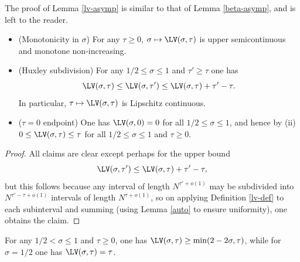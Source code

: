 The proof of Lemma \ref{lv-asymp} is similar to that of Lemma \ref{beta-asymp}, and is left to the reader.


\begin{lemma}\label{lv-basic}
    \begin{itemize}
        \item[(i)] (Monotonicity in $\sigma$) For any $\tau \geq 0$, $\sigma \mapsto \LV(\sigma,\tau)$ is upper semicontinuous and monotone non-increasing.
        \item[(ii)] (Huxley subdivision) For any $1/2 \leq \sigma \leq 1$ and $\tau' \geq \tau$ one has
$$ \LV(\sigma,\tau) \leq \LV(\sigma,\tau') \leq \LV(\sigma,\tau) + \tau'-\tau.$$
In particular, $\tau \mapsto \LV(\sigma,\tau)$ is Lipschitz continuous.
        \item[(iii)]  ($\tau=0$ endpoint) One has $\LV(\sigma,0)=0$ for all $1/2 \leq \sigma \leq 1$, and hence by (ii) $0 \leq \LV(\sigma,\tau) \leq \tau$ for all $1/2 \leq \sigma \leq 1$ and $\tau \geq 0$.
    \end{itemize}
\end{lemma}


\begin{proof}
All claims are clear except perhaps for the upper bound
$$ \LV(\sigma,\tau') \leq \LV(\sigma,\tau) + \tau'-\tau,$$
but this follows because any interval of length $N^{\tau'+o(1)}$ may be subdivided into $N^{\tau'-\tau+o(1)}$ intervals of length $N^{\tau+o(1)}$, so on applying Definition \ref{lv-def} to each subinterval and summing (using Lemma \ref{auto} to ensure uniformity), one obtains the claim.
\end{proof}

\begin{lemma}\label{lv-lower}  For any $1/2 < \sigma \leq 1$ and $\tau \geq 0$, one has $\LV(\sigma, \tau) \geq \min(2 - 2 \sigma,\tau)$, while for $\sigma=1/2$ one has $\LV(\sigma,\tau) = \tau$.
\end{lemma}

